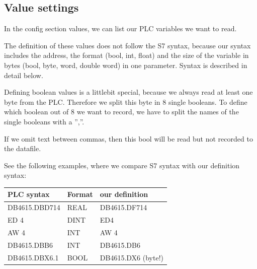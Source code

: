 \documentclass[a4paper,10pt,english]{sphinxmanual}
\begin{document}
\subsection{Value settings}
\label{configuration:value-settings}
In the config section values, we can list our PLC variables we want to read.

The definition of these values does not follow the S7 syntax, because our syntax includes the address, the format (bool, int, float) and the size of the variable in bytes (bool, byte, word, double word) in one parameter. Syntax is described in detail below.

Defining boolean values is a littlebit special, because we always read at least one byte from the PLC. Therefore we split this byte in 8 single booleans. To define which boolean out of 8 we want to record, we have to split the names of the single booleans with a '',''.

If we omit text between commas, then this bool will be read but not recorded to the datafile.

See the following examples, where we compare S7 syntax with our definition syntax:

\begin{tabulary}{\linewidth}{|L|L|L|}
\hline
\textsf{\relax 
PLC syntax
} & \textsf{\relax 
Format
} & \textsf{\relax 
our definition
}\\
\hline
DB4615.DBD714
 & 
REAL
 & 
DB4615.DF714
\\
\hline
ED 4
 & 
DINT
 & 
ED4
\\
\hline
AW 4
 & 
INT
 & 
AW 4
\\
\hline
DB4615.DBB6
 & 
INT
 & 
DB4615.DB6
\\
\hline
DB4615.DBX6.1
 & 
BOOL
 & 
DB4615.DX6 (byte!)
\\
\hline\end{tabulary}
\end{document}

